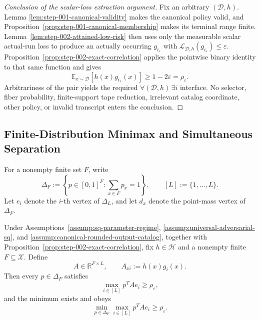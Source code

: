 \begin{proof}[Conclusion of the scalar-loss extraction argument]
Fix an arbitrary \((\mathcal D,h)\).  Lemma
\ref{lem:step-001-canonical-validity} makes the canonical policy valid, and
Proposition~\ref{prop:step-001-canonical-membership} makes its terminal range
finite.  Lemma~\ref{lem:step-002-attained-low-risk} then uses only the
measurable scalar actual-run loss to produce an actually occurring
\(g_{i_*}\) with
\(\mathcal L_{\mathcal D,h}(g_{i_*})\le\varepsilon\).
Proposition~\ref{prop:step-002-exact-correlation} applies the pointwise binary
identity to that same function and gives
\[
\mathbb E_{x\sim\mathcal D}[h(x)g_{i_*}(x)]
\ge1-2\varepsilon=\rho_{\varepsilon}.
\]
Arbitrariness of the pair yields the required
\(\forall(\mathcal D,h)\,\exists i\) interface.  No selector, fiber
probability, finite-support tape reduction, irrelevant catalog coordinate,
other policy, or invalid transcript enters the conclusion.
\end{proof}

\subsection{Finite-Distribution Minimax and Simultaneous Separation}
\label{app:step-003}

For a nonempty finite set \(F\), write
\[
\Delta_F:=\left\{p\in[0,1]^F:\sum_{x\in F}p_x=1\right\},
\qquad [L]:=\{1,\ldots,L\}.
\]
Let \(e_i\) denote the \(i\)-th vertex of \(\Delta_L\), and let \(d_x\)
denote the point-mass vertex of \(\Delta_F\).

\begin{lemma}
\label{lem:step-003-game-lower-bound}
Under Assumptions~\ref{assump:sq-parameter-regime},
\ref{assump:universal-adversarial-sq}, and
\ref{assump:canonical-rounded-output-catalog}, together with
Proposition~\ref{prop:step-002-exact-correlation}, fix
\(h\in\mathcal H\) and a nonempty finite \(F\subseteq\mathcal X\).  Define
\begin{equation}
A\in\mathbb R^{F\times L},
\qquad
A_{xi}:=h(x)g_i(x).
\label{eq:step-003-payoff-matrix}
\end{equation}
Then every \(p\in\Delta_F\) satisfies
\[
\max_{i\in[L]}p^{T}Ae_i\ge\rho_{\varepsilon},
\]
and the minimum exists and obeys
\begin{equation}
\min_{p\in\Delta_F}\max_{i\in[L]}p^{T}Ae_i
\ge\rho_{\varepsilon}.
\label{eq:step-003-left-value}
\end{equation}
\end{lemma}

